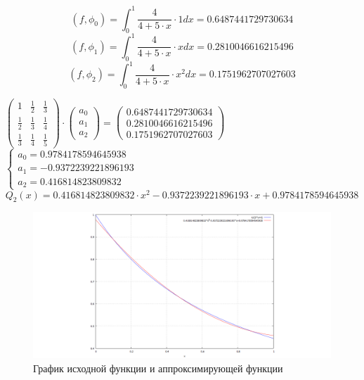 \begin{displaymath}
(f, \phi_0) = \int_0^1 \frac{4}{4 + 5 \cdot x} \cdot 1 dx = 0.6487441729730634
\end{displaymath}
\begin{displaymath}
(f, \phi_1) = \int_0^1 \frac{4}{4 + 5 \cdot x} \cdot x dx = 0.2810046616215496
\end{displaymath}
\begin{displaymath}
(f, \phi_2) = \int_0^1 \frac{4}{4 + 5 \cdot x} \cdot x^2 dx = 0.1751962707027603
\end{displaymath}

$
\begin{pmatrix}
1 & \frac{1}{2} & \frac{1}{3}
\\
\frac{1}{2} & \frac{1}{3} & \frac{1}{4}
\\
\frac{1}{3} & \frac{1}{4} & \frac{1}{5}
\end{pmatrix}
\cdot
\begin{pmatrix}
a_0
\\
a_1
\\
a_2
\end{pmatrix}
=
\begin{pmatrix}
0.6487441729730634
\\
0.2810046616215496
\\
0.1751962707027603
\end{pmatrix}
$\\[1mm]

$
 \begin{cases}
  a_0 = 0.9784178594645938
\\
  a_1 = -0.9372239221896193
\\
  a_2 = 0.416814823809832
 \end{cases}
$\\[1mm]

\begin{displaymath}
Q_2(x) = 0.416814823809832 \cdot x^2 - 0.9372239221896193 \cdot x + 0.9784178594645938
\end{displaymath}

\begin{figure}[H]
	\begin{center}
		\includegraphics[width=19cm]{polynoms.png}
		\caption{График исходной функции и аппроксимирующей функции} 
		\label{pic:2:1:1}
	\end{center}
\end{figure}

